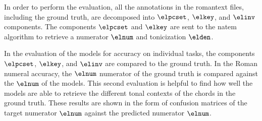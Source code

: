 
In order to perform the evaluation, all the annotations in
the \gls{romantext} files, including the ground truth, are
decomposed into $\elpcset$, $\elkey$, and $\elinv$
components. The components $\elpcset$ and $\elkey$ are sent
to the \gls{natem} algorithm to retrieve a numerator
$\elnum$ and tonicization $\elden$.

In the evaluation of the models for accuracy on individual
tasks, the components $\elpcset$, $\elkey$, and $\elinv$ are
compared to the ground truth. In the Roman numeral accuracy,
the $\elnum$ numerator of the ground truth is compared
against the $\elnum$ of the models. This second evaluation
is helpful to find how well the models are able to retrieve
the different tonal contexts of the chords in the ground
truth. These results are shown in the form of confusion
matrices of the target numerator $\elnum$ against the
predicted numerator $\elnum$.



